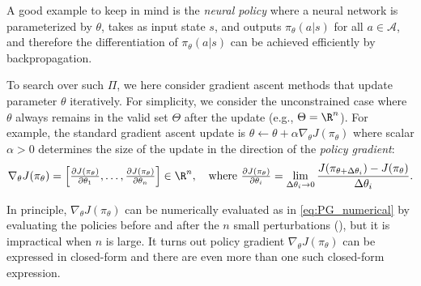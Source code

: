 A good example to keep in mind is the {\em neural policy} where a neural network is parameterized by $\theta$, takes as input state $s$, and outputs $\pi_\theta(a|s)$ for all $a\in\mathcal{A}$, and therefore the differentiation of $\pi_\theta(a|s)$ can be achieved efficiently by backpropagation.

To search over such $\Pi$, we here consider gradient ascent methods that update parameter $\theta$ iteratively. 
For simplicity, we consider the unconstrained case where $\theta$ always remains in the valid set $\Theta$ after the update (e.g., $\Theta=\R^n$).
For example, the standard gradient ascent update is $\theta \gets \theta + \alpha \nabla_\theta J(\pi_\theta)$ where scalar $\alpha>0$ determines the size of the update in the direction of the {\em policy gradient}:
\begin{align}
\label{eq:PG_numerical}
   \nabla_\theta J(\pi_\theta)  = \left[\tfrac{\partial J(\pi_\theta)}{\partial\theta_1},\ldots,\tfrac{\partial J(\pi_\theta)}{\partial\theta_n}\right]\in\R^n,
   \quad\text{where }
   \tfrac{\partial J(\pi_\theta)}{\partial\theta_i}
   = \lim_{\Delta\theta_i \to 0} \frac{J(\pi_{\theta+\Delta\theta_i})-J(\pi_\theta)}{\Delta\theta_i}.
\end{align}

In principle, $\nabla_\theta J(\pi_\theta)$ can be numerically evaluated as in \eqref{eq:PG_numerical} by evaluating the policies before and after the $n$ small perturbations (), but it is impractical when $n$ is large.  
It turns out policy gradient $\nabla_\theta J(\pi_\theta)$ can be expressed in closed-form and there are even more than one such closed-form expression.

